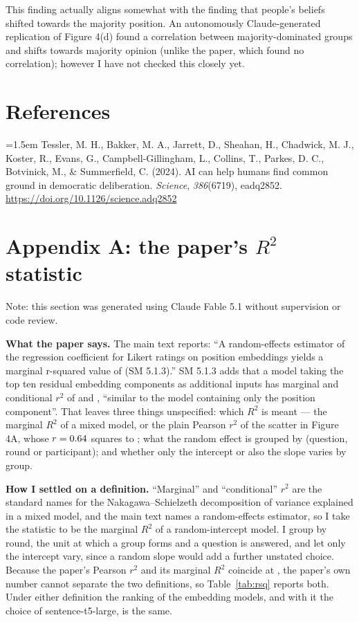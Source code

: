 \documentclass[11pt,a4paper]{article}
\begin{document}
This finding actually aligns somewhat with the finding that people's beliefs shifted towards the
majority position. An autonomously Claude-generated replication of Figure 4(d) found a correlation
between majority-dominated groups and shifts towards majority opinion (unlike the paper, which found
no correlation); however I have not checked this closely yet.

\section*{References}

{\hangindent=1.5em
Tessler, M. H., Bakker, M. A., Jarrett, D., Sheahan, H., Chadwick, M. J., Koster, R., Evans, G.,
Campbell-Gillingham, L., Collins, T., Parkes, D. C., Botvinick, M., \& Summerfield, C. (2024). AI
can help humans find common ground in democratic deliberation. \emph{Science}, \emph{386}(6719),
eadq2852. \href{https://doi.org/10.1126/science.adq2852}{https://doi.org/10.1126/science.adq2852}\par}

\clearpage
\section*{Appendix A: the paper's $R^2$ statistic}
\label{app:rsq}

Note: this section was generated using Claude Fable 5.1 without supervision or code review.

\textbf{What the paper says.} The main text reports: ``A random-effects estimator of the
regression coefficient for Likert ratings on position embeddings yields a marginal r-squared value
of \paperMarginalRsq{} (SM 5.1.3).'' SM 5.1.3 adds that a model taking the top ten residual
embedding components as additional inputs has marginal and conditional $r^2$ of \paperMarginalRsq{}
and \paperConditionalRsq{}, ``similar to the model containing only the position component''. That
leaves three things unspecified: which $R^2$ is meant --- the marginal $R^2$ of a mixed model, or
the plain Pearson $r^2$ of the scatter in Figure 4A, whose $r=0.64{}$ squares to
\paperFigArSq{}; what the random effect is grouped by (question, round or participant); and whether
only the intercept or also the slope varies by group.

\textbf{How I settled on a definition.} ``Marginal'' and ``conditional'' $r^2$ are the
standard names for the Nakagawa--Schielzeth decomposition of variance explained in a mixed model,
and the main text names a random-effects estimator, so I take the statistic to be the marginal
$R^2$ of a random-intercept model. I group by round, the unit at which a group forms and a question
is answered, and let only the intercept vary, since a random slope would add a further unstated
choice. Because the paper's Pearson $r^2$ and its marginal $R^2$ coincide at \paperMarginalRsq{},
the paper's own number cannot separate the two definitions, so Table~\ref{tab:rsq} reports both.
Under either definition the ranking of the embedding models, and with it the choice of
sentence-t5-large, is the same.
\end{document}
